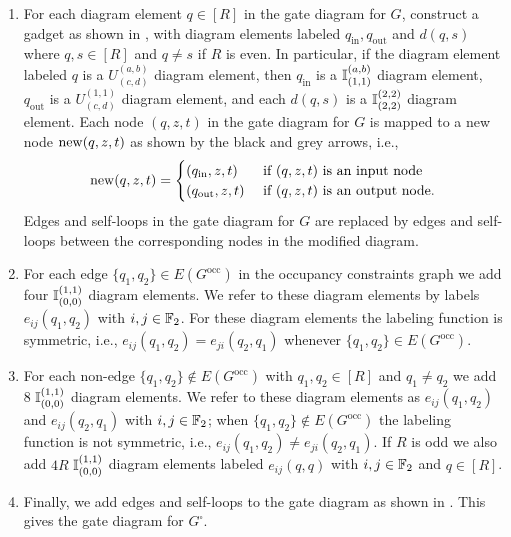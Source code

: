 \documentclass[../thesis-main/thesis-main]{subfiles}
\begin{document}
\begin{enumerate}
\item For each diagram element $q\in[R]$ in the gate diagram for $G$, construct a gadget as shown in , with diagram elements labeled $q_{\text{in}},q_{\text{out}}$ and $d(q,s)$ where $q,s\in[R]$ and $q\neq s$ if $R$ is even.  In particular, if the diagram element labeled $q$ is a $U^{(a,b)}_{(c,d)}$ diagram element, then $q_{\text{in}}$ is a $\mathbb{I}^{(a,b)}_{(1,1)}$ diagram element, $q_{\text{out}}$ is a $U^{(1,1)}_{(c,d)}$ diagram element, and each $d(q,s)$ is a $\mathbb{I}^{(2,2)}_{(2,2)}$ diagram element.   Each node $(q,z,t)$ in the gate diagram for $G$ is mapped to a new node $\operatorname{new}(q,z,t)$ as shown by the black and grey arrows, i.e., 
\begin{equation}
  \operatorname{new}(q,z,t)=\begin{cases}
    (q_{\mathrm{in}},z,t) & \text{ if }(q,z,t)\text{ is an input node}\\
    (q_{\mathrm{out}},z,t) & \text{ if }(q,z,t)\text{ is an output node}.
  \end{cases}\label{eq:node_mapping_G_G_square}
\end{equation}
Edges and self-loops in the gate diagram for $G$ are replaced by edges and self-loops between the corresponding nodes in the modified diagram.

\item For each edge $\{q_{1},q_{2}\}\in E(G^{\text{occ}})$ in the occupancy constraints graph we add four $\mathbb{I}^{(1,1)}_{(0,0)}$ diagram elements.  We refer to these diagram elements by labels $e_{ij}(q_{1},q_{2})$ with $i,j\in\mathbb{F}_2$. For these diagram elements the labeling function is symmetric, i.e., $e_{ij}(q_{1},q_{2})=e_{ji}(q_{2},q_{1})$ whenever $\{q_{1},q_{2}\}\in E(G^{\text{occ}})$.

\item For each non-edge $\{q_{1},q_{2}\}\notin E(G^{\text{occ}})$ with $q_{1},q_{2}\in[R]$ and $q_{1}\neq q_{2}$ we add $8$ $\mathbb{I}^{(1,1)}_{(0,0)}$ diagram elements. We refer to these diagram elements as $e_{ij}(q_{1},q_{2})$ and $e_{ij}(q_{2},q_{1})$ with $i,j\in\mathbb{F}_2$; when $\{q_1,q_2\}\notin E(G^{\text{occ}})$ the labeling function is not symmetric, i.e., $e_{ij}(q_{1},q_{2})\neq e_{ji}(q_{2},q_{1})$. If $R$ is odd we also add $4R$ $\mathbb{I}^{(1,1)}_{(0,0)}$ diagram elements labeled $e_{ij}(q,q)$ with $i,j\in\mathbb{F}_2$ and $q\in[R]$.

\item Finally, we add edges and self-loops to the gate diagram as shown in . This gives the gate diagram for $G^{\square}$.
\end{enumerate}
\end{document}

